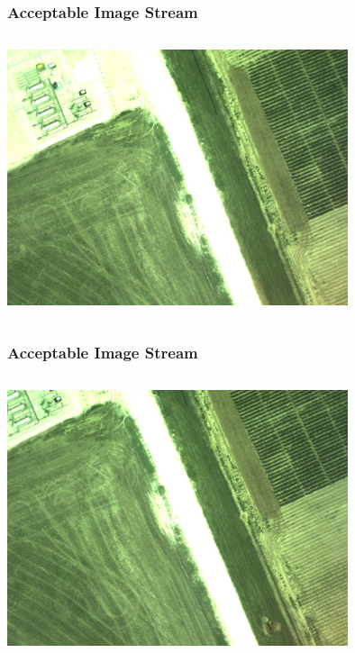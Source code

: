 \documentclass{beamer}
\begin{document}
\begin{frame} [noframenumbering]
\frametitle{Acceptable Image Stream}
\begin{columns}
\begin{centering}
\includegraphics[width = 10cm]{Figures/good3}
\end{centering}
\end{columns}
\end{frame}


\begin{frame} [noframenumbering]
\frametitle{Acceptable Image Stream}
\begin{columns}
\begin{centering}
\includegraphics[width = 10cm]{Figures/good4}
\end{centering}
\end{columns}
\end{frame}
\end{document}
